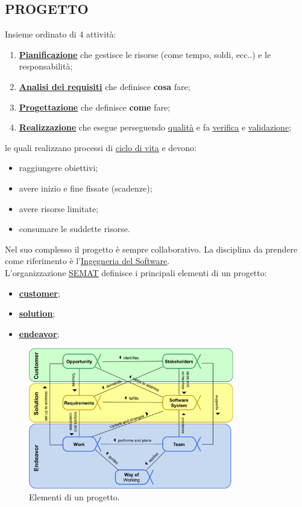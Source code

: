 		\subsection{PROGETTO}  \label{progetto}
		Insieme ordinato di 4 attività:
			\begin{enumerate}
				\item \underline{\hyperref[pianificazione]{\textbf{Pianificazione}}} che gestisce le risorse (come tempo, soldi, ecc..) e le responsabilità;
				\item \underline{\hyperref[analisideirequisiti]{\textbf{Analisi dei requisiti}}} che definisce \textbf{cosa} fare;
				\item \underline{\hyperref[progettazione]{\textbf{Progettazione}}} che definisce \textbf{come} fare;
				\item \underline{\hyperref[realizzazione]{\textbf{Realizzazione}}} che esegue perseguendo \underline{\hyperref[qualita]{qualità}} e fa \underline{\hyperref[verificare]{verifica}} e \underline{\hyperref[validare]{validazione}};
			\end{enumerate}	
		le quali realizzano processi di \underline{\hyperref[ciclo]{ciclo di vita}} e devono:
			\begin {itemize}
				\item raggiungere obiettivi;
				\item avere inizio e fine fissate (scadenze);
				\item avere risorse limitate;
				\item consumare le suddette risorse.
			\end {itemize}
		Nel suo complesso il progetto è sempre collaborativo. La disciplina da prendere come riferimento è l'\underline{\hyperref[swe]{Ingegneria del Software}}.\\
		L'organizzazione \underline{\hyperref[semat]{SEMAT}} definisce i principali elementi di un progetto:
			\begin{itemize}
				\item \textbf{\underline{\hyperref[customer]{customer}}};
				\item \textbf{\underline{\hyperref[solution]{solution}}};
				\item \textbf{\underline{\hyperref[endeavor]{endeavor}}};
			\end{itemize}
		
		\begin{figure}[H]
			\centering
			\includegraphics[width=0.8\textwidth]{img/prog}		
			\caption{Elementi di un progetto.}
		\end{figure} 
		
